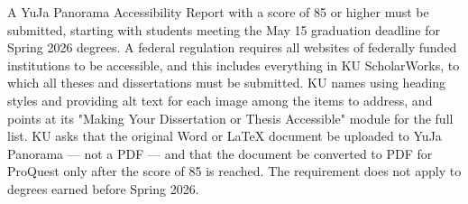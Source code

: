 
%

%
%
%
\thesisrequiretagging
{}
	{A YuJa Panorama Accessibility Report with a score of 85 or higher must be
	 submitted, starting with students meeting the May 15 graduation deadline
	 for Spring 2026 degrees.}
	{A federal regulation requires all websites of federally funded institutions
	 to be accessible, and this includes everything in KU ScholarWorks, to which
	 all theses and dissertations must be submitted.}
	{KU names using heading styles and providing alt text for each image among
	 the items to address, and points at its "Making Your Dissertation or Thesis
	 Accessible" module for the full list.}
	{KU asks that the original Word or LaTeX document be uploaded to YuJa
	 Panorama — not a PDF — and that the document be converted to PDF for
	 ProQuest only after the score of 85 is reached.}
	{The requirement does not apply to degrees earned before Spring 2026.}

